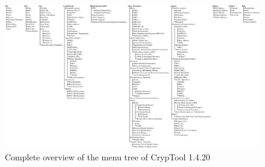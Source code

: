 \clearpage
\begin{figure}[hb]
\begin{center}
\vspace{-30pt}
\includegraphics[scale=0.25, angle=270, viewport=200 30 2660 1430]
                {figures/cryptool-menu-en}
\caption{Complete overview of the menu tree of CrypTool 1.4.20} 
\label{menuoverview}
\end{center}
\end{figure}
\clearpage
